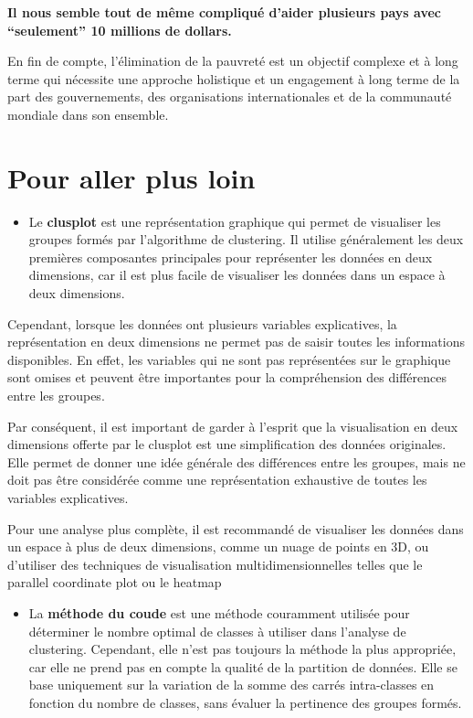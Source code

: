 \documentclass[
]{article}
\providecommand{\tightlist}{%
  \setlength{\itemsep}{0pt}\setlength{\parskip}{0pt}}
\begin{document}
\textbf{Il nous semble tout de même compliqué d'aider plusieurs pays
avec ``seulement'' 10 millions de dollars.}

En fin de compte, l'élimination de la pauvreté est un objectif complexe
et à long terme qui nécessite une approche holistique et un engagement à
long terme de la part des gouvernements, des organisations
internationales et de la communauté mondiale dans son ensemble.

\hypertarget{pour-aller-plus-loin}{%
\section{Pour aller plus loin}\label{pour-aller-plus-loin}}

\begin{itemize}
\tightlist
\item
  Le \textbf{clusplot} est une représentation graphique qui permet de
  visualiser les groupes formés par l'algorithme de clustering. Il
  utilise généralement les deux premières composantes principales pour
  représenter les données en deux dimensions, car il est plus facile de
  visualiser les données dans un espace à deux dimensions.
\end{itemize}

Cependant, lorsque les données ont plusieurs variables explicatives, la
représentation en deux dimensions ne permet pas de saisir toutes les
informations disponibles. En effet, les variables qui ne sont pas
représentées sur le graphique sont omises et peuvent être importantes
pour la compréhension des différences entre les groupes.

Par conséquent, il est important de garder à l'esprit que la
visualisation en deux dimensions offerte par le clusplot est une
simplification des données originales. Elle permet de donner une idée
générale des différences entre les groupes, mais ne doit pas être
considérée comme une représentation exhaustive de toutes les variables
explicatives.

Pour une analyse plus complète, il est recommandé de visualiser les
données dans un espace à plus de deux dimensions, comme un nuage de
points en 3D, ou d'utiliser des techniques de visualisation
multidimensionnelles telles que le parallel coordinate plot ou le
heatmap

\begin{itemize}
\tightlist
\item
  La \textbf{méthode du coude} est une méthode couramment utilisée pour
  déterminer le nombre optimal de classes à utiliser dans l'analyse de
  clustering. Cependant, elle n'est pas toujours la méthode la plus
  appropriée, car elle ne prend pas en compte la qualité de la partition
  de données. Elle se base uniquement sur la variation de la somme des
  carrés intra-classes en fonction du nombre de classes, sans évaluer la
  pertinence des groupes formés.
\end{itemize}
\end{document}
